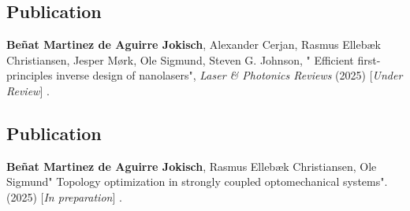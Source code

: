\begin{center}
  \begin{minipage}{0.9\linewidth}
    \section*{Publication \cite{ownpub4}}
    \textbf{Beñat Martinez de Aguirre Jokisch}, Alexander Cerjan, Rasmus Ellebæk Christiansen, Jesper Mørk, Ole Sigmund, Steven G. Johnson, "
    Efficient first-principles inverse design of nanolasers", \textit{Laser \& Photonics Reviews} (2025) [\textit{Under Review}] .
  \end{minipage}
\end{center}
\newpage

\cleardoublepage
\vspace*{0.4\textheight}
\begin{center}
  \begin{minipage}{0.9\linewidth}
    \section*{Publication \cite{ownpub5}}
    \textbf{Beñat Martinez de Aguirre Jokisch}, Rasmus Ellebæk Christiansen, Ole Sigmund"
    Topology optimization in strongly coupled optomechanical systems". (2025) [\textit{In preparation}] .
  \end{minipage}
\end{center}
\newpage


%

